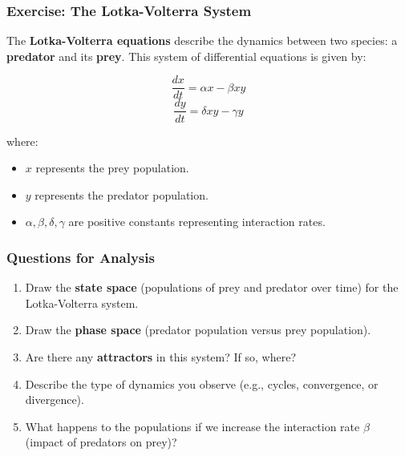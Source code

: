 \documentclass{beamer}
\begin{document}
\begin{frame}
    \frametitle{Exercise: The Lotka-Volterra System}

    The \textbf{Lotka-Volterra equations} describe the dynamics between two species: a \textbf{predator} and its \textbf{prey}. This system of differential equations is given by:

    \[
    \frac{dx}{dt} = \alpha x - \beta x y
    \]
    \[
    \frac{dy}{dt} = \delta x y - \gamma y
    \]

    where:
    \begin{itemize}
        \item \( x \) represents the prey population.
        \item \( y \) represents the predator population.
        \item \( \alpha, \beta, \delta, \gamma \) are positive constants representing interaction rates.
    \end{itemize}
\end{frame}

\begin{frame}
    \frametitle{Questions for Analysis}

    \begin{enumerate}
        \item Draw the \textbf{state space} (populations of prey and predator over time) for the Lotka-Volterra system.
        \item Draw the \textbf{phase space} (predator population versus prey population).
        \item Are there any \textbf{attractors} in this system? If so, where?
        \item Describe the type of dynamics you observe (e.g., cycles, convergence, or divergence).
        \item What happens to the populations if we increase the interaction rate \( \beta \) (impact of predators on prey)?
    \end{enumerate}
\end{frame}
\end{document}
